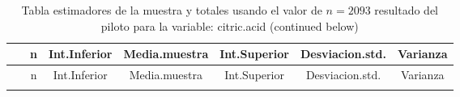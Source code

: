 \documentclass[
]{article}
\begin{document}
\begin{longtable}[]{@{}ccccccc@{}}
\caption{Tabla estimadores de la muestra y totales usando el valor de
\(n = 2093\) resultado del piloto para la variable: citric.acid
(continued below)}\tabularnewline
\toprule
\begin{minipage}[b]{0.20\columnwidth}\centering
~\strut
\end{minipage} & \begin{minipage}[b]{0.05\columnwidth}\centering
n\strut
\end{minipage} & \begin{minipage}[b]{0.11\columnwidth}\centering
Int.Inferior\strut
\end{minipage} & \begin{minipage}[b]{0.12\columnwidth}\centering
Media.muestra\strut
\end{minipage} & \begin{minipage}[b]{0.11\columnwidth}\centering
Int.Superior\strut
\end{minipage} & \begin{minipage}[b]{0.13\columnwidth}\centering
Desviacion.std.\strut
\end{minipage} & \begin{minipage}[b]{0.09\columnwidth}\centering
Varianza\strut
\end{minipage}\tabularnewline
\midrule
\endfirsthead
\toprule
\begin{minipage}[b]{0.20\columnwidth}\centering
~\strut
\end{minipage} & \begin{minipage}[b]{0.05\columnwidth}\centering
n\strut
\end{minipage} & \begin{minipage}[b]{0.11\columnwidth}\centering
Int.Inferior\strut
\end{minipage} & \begin{minipage}[b]{0.12\columnwidth}\centering
Media.muestra\strut
\end{minipage} & \begin{minipage}[b]{0.11\columnwidth}\centering
Int.Superior\strut
\end{minipage} & \begin{minipage}[b]{0.13\columnwidth}\centering
Desviacion.std.\strut
\end{minipage} & \begin{minipage}[b]{0.09\columnwidth}\centering
Varianza\strut
\end{minipage}\tabularnewline
\midrule
\endhead
\begin{minipage}[t]{0.20\columnwidth}\centering

\end{minipage}
\end{longtable}
\end{document}
